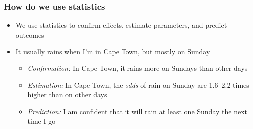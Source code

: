 \documentclass{beamer}
\begin{document}
\begin{frame}

\frametitle{How do we use statistics}\begin{itemize}

\item We use statistics to confirm effects, estimate parameters, and
	predict outcomes

\item It usually rains when I'm in Cape Town, but mostly on Sunday\begin{itemize}

\item \emph{Confirmation:} In Cape Town, it rains more on Sundays than
		other days

\item \emph{Estimation:} In Cape Town, the \emph{odds} of rain on
		Sunday are 1.6--2.2 times higher than on other days

\item \emph{Prediction:} I am confident that it will rain at least one
		Sunday the next time I go\end{itemize}\end{itemize}
\end{frame}
\end{document}
